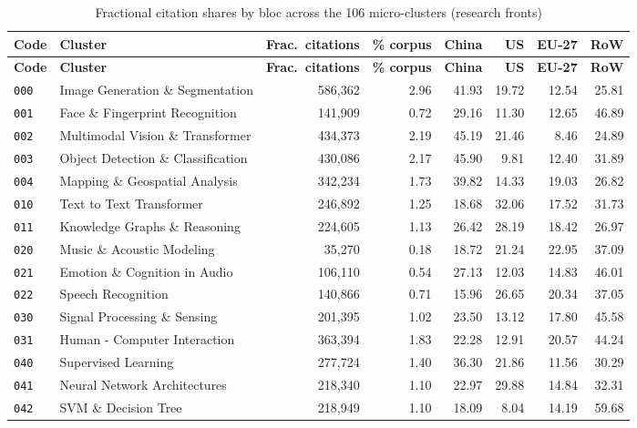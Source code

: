 \begin{longtable}{@{}l l r r r r r r@{}}
\caption{Fractional citation shares by bloc across the 106 micro-clusters (research fronts)}\label{tab:s3}\\
\toprule
\textbf{Code} & \textbf{Cluster} & \textbf{Frac.\ citations} & \textbf{\% corpus} & \textbf{China} & \textbf{US} & \textbf{EU-27} & \textbf{RoW} \\
\midrule
\endfirsthead
\toprule
\textbf{Code} & \textbf{Cluster} & \textbf{Frac.\ citations} & \textbf{\% corpus} & \textbf{China} & \textbf{US} & \textbf{EU-27} & \textbf{RoW} \\
\midrule
\endhead
\bottomrule
\endlastfoot
\texttt{000} & Image Generation \& Segmentation & 586,362 & 2.96 & 41.93 & 19.72 & 12.54 & 25.81 \\
\texttt{001} & Face \& Fingerprint Recognition & 141,909 & 0.72 & 29.16 & 11.30 & 12.65 & 46.89 \\
\texttt{002} & Multimodal Vision \& Transformer & 434,373 & 2.19 & 45.19 & 21.46 & 8.46 & 24.89 \\
\texttt{003} & Object Detection \& Classification & 430,086 & 2.17 & 45.90 & 9.81 & 12.40 & 31.89 \\
\texttt{004} & Mapping \& Geospatial Analysis & 342,234 & 1.73 & 39.82 & 14.33 & 19.03 & 26.82 \\
\texttt{010} & Text to Text Transformer & 246,892 & 1.25 & 18.68 & 32.06 & 17.52 & 31.73 \\
\texttt{011} & Knowledge Graphs \& Reasoning & 224,605 & 1.13 & 26.42 & 28.19 & 18.42 & 26.97 \\
\texttt{020} & Music \& Acoustic Modeling & 35,270 & 0.18 & 18.72 & 21.24 & 22.95 & 37.09 \\
\texttt{021} & Emotion \& Cognition in Audio & 106,110 & 0.54 & 27.13 & 12.03 & 14.83 & 46.01 \\
\texttt{022} & Speech Recognition & 140,866 & 0.71 & 15.96 & 26.65 & 20.34 & 37.05 \\
\texttt{030} & Signal Processing \& Sensing & 201,395 & 1.02 & 23.50 & 13.12 & 17.80 & 45.58 \\
\texttt{031} & Human - Computer Interaction & 363,394 & 1.83 & 22.28 & 12.91 & 20.57 & 44.24 \\
\texttt{040} & Supervised Learning & 277,724 & 1.40 & 36.30 & 21.86 & 11.56 & 30.29 \\
\texttt{041} & Neural Network Architectures & 218,340 & 1.10 & 22.97 & 29.88 & 14.84 & 32.31 \\
\texttt{042} & SVM \& Decision Tree & 218,949 & 1.10 & 18.09 & 8.04 & 14.19 & 59.68 \\

\end{longtable}
